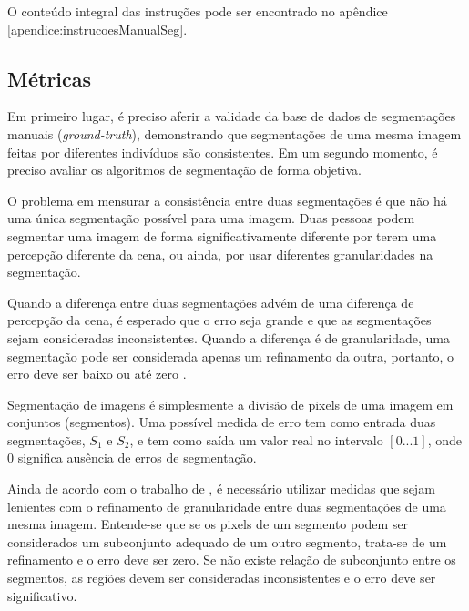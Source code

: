 O conteúdo integral das instruções pode ser encontrado no apêndice \ref{apendice:instrucoesManualSeg}.

\subsection{Métricas}


Em primeiro lugar, é preciso aferir a validade da base de dados de segmentações manuais (\textit{ground-truth}), demonstrando que segmentações de uma mesma imagem feitas por diferentes indivíduos são consistentes. Em um segundo momento, é preciso avaliar os algoritmos de segmentação de forma objetiva.

O problema em mensurar a consistência entre duas segmentações é que não há uma única segmentação possível para uma imagem. Duas pessoas podem segmentar uma imagem de forma significativamente diferente por terem uma percepção diferente da cena, ou ainda, por usar diferentes granularidades na segmentação.

Quando a diferença entre duas segmentações advém de uma diferença de percepção da cena, é esperado que o erro seja grande e que as segmentações sejam consideradas inconsistentes. Quando a diferença é de granularidade, uma segmentação pode ser considerada apenas um refinamento da outra, portanto, o erro deve ser baixo ou até zero \cite{martin:2001}.


Segmentação de imagens é simplesmente a divisão de pixels de uma imagem em conjuntos (segmentos). Uma possível medida de erro tem como entrada duas segmentações, $S_1$ e $S_2$, e tem como saída um valor real no intervalo $[0...1]$, onde $0$ significa ausência de erros de segmentação.

Ainda de acordo com o trabalho de , é necessário utilizar medidas que sejam lenientes com o refinamento de granularidade entre duas segmentações de uma mesma imagem. Entende-se que se os pixels de um segmento podem ser considerados um subconjunto adequado de um outro segmento, trata-se de um refinamento e o erro deve ser zero. Se não existe relação de subconjunto entre os segmentos, as regiões devem ser consideradas inconsistentes e o erro deve ser significativo.

